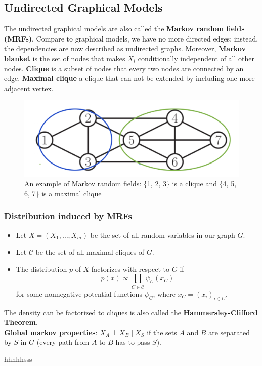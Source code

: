 \subsection{Undirected Graphical Models}
The undirected graphical models are also called the \textbf{Markov random fields (MRFs)}. Compare to graphical models, we have no more directed edges; instead, the dependencies are now described as undirected graphs. Moreover, \textbf{Markov blanket} is the set of nodes that makes $X_i$ conditionally independent of all other nodes. \textbf{Clique} is a subset of nodes that every two nodes are connected by an edge. \textbf{Maximal clique} a clique that can not be extended by including one more adjacent vertex.
\begin{figure}[H]
    \centering
    \includegraphics[width = .7\linewidth]{figure_7.png}
    \caption{An example of Markov random fields: \{1, 2, 3\} is a clique and \{4, 5, 6, 7\} is a maximal clique}
\end{figure}
\subsubsection*{Distribution induced by MRFs}
\begin{itemize}
    \item Let $X=\left(X_1, \ldots, X_m\right)$ be the set of all random variables in our graph $G$.
    \item Let $\mathcal{C}$ be the set of all maximal cliques of $G$.
    \item The distribution $p$ of $X$ factorizes with respect to $G$ if
$$
p(x) \propto \prod_{C \in \mathcal{C}} \psi_{\mathcal{C}}\left(x_C\right)
$$
for some nonnegative potential functions $\psi_C$, where $x_C=\left(x_i\right)_{i \in C}$.
\end{itemize}
The density can be factorized to cliques is also called the \textbf{Hammersley-Clifford Theorem}.\\
\textbf{Global markov properties}: $X_A\perp X_B\mid X_S$ if the sets $A$ and $B$ are separated by $S$ in $G$ (every path from $A$ to $B$ has to pass $S$).

hhhhhsss
